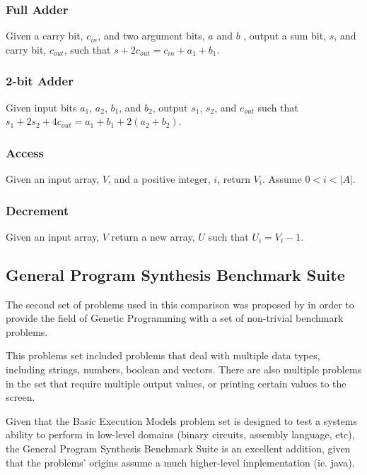\subsubsection{Full Adder}

Given a carry bit, $c_{in}$, and two argument bits, $a$ and $b$ , output a sum bit, $s$, and carry bit, $c_{out}$, such that  $s + 2c_{out} = c_{in} + a_1 + b_1$.

\subsubsection{2-bit Adder}

Given input bits $a_1$, $a_2$, $b_1$, and $b_2$, output $s_1$, $s_2$, and $c_{out}$ such that  $s_1 + 2s_2 + 4c_{out} = a_1 + b_1 + 2(a_2 + b_2)$.

\subsubsection{Access}

Given an input array, $V$, and a positive integer, $i$, return $V_i$. Assume $0 < i < |A|$.

\subsubsection{Decrement}

Given an input array, $V$ return a new array, $U$ such that $U_i = V_i - 1$.


\subsection{General Program Synthesis Benchmark Suite}
The second set of problems used in this comparison was proposed by \cite{Helmuth2015b} in order to provide the field of Genetic Programming with a set of non-trivial benchmark problems.

This problems set included problems that deal with multiple data types, including strings, numbers, boolean and vectors. There are also multiple problems in the set that require multiple output values, or printing certain values to the screen.

Given that the Basic Execution Models problem set is designed to test a systems ability to perform in low-level domains (binary circuits, assembly language, etc), the General Program Synthesis Benchmark Suite is an excellent addition, given that the problems' origins assume a much higher-level implementation (ie. java).

